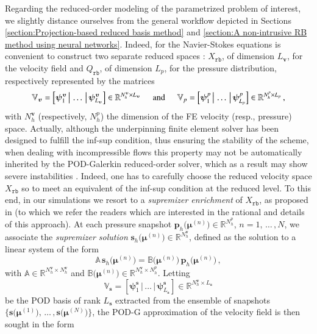 \documentclass{elsarticle}
\numberwithin{equation}{section}
\theoremstyle{theorem}
\theoremstyle{definition}
\theoremstyle{remark}
\theoremstyle{proposition}
\numberwithin{figure}{section}
\newcommand{\bg}[1]{\boldsymbol{#1}}
\begin{document}
		Regarding the reduced-order modeling of the parametrized problem of interest, we slightly distance ourselves from the general workflow depicted in Sections \ref{section:Projection-based reduced basis method} and \ref{section:A non-intrusive RB method using neural networks}. Indeed, for the Navier-Stokes equations is convenient to construct two separate reduced spaces \cite{Bal14, Chen17, QMN15}: $X_{\texttt{rb}}$, of dimension $L_{\bg{v}}$, for the velocity field and $Q_{\texttt{rb}}$, of dimension $L_p$, for the pressure distribution, respectively represented by the matrices 
		\begin{equation*}
			\mathbb{V}_{\bg{v}} = \left[ \bg{\psi}_1^{\bg{v}} \, \big| \, \ldots \, \big| \, \bg{\psi}_{L_{\bg{v}}}^{\bg{v}} \right] \in \mathbb{R}^{N_h^{\bg{v}} \times L_{\bg{v}}} \hspace*{0.5cm} \text{and} \hspace*{0.5cm} \mathbb{V}_p = \left[ \bg{\psi}_1^p \, \big| \, \ldots \, \big| \, \bg{\psi}_{L_p}^p \right] \in \mathbb{R}^{N_h^p \times L_p} \, ,
		\end{equation*} 
		with $N_h^{\bg{v}}$ (respectively, $N_h^p$) the dimension of the FE velocity (resp., pressure) space. Actually, although the underpinning finite element solver has been designed to fulfill the inf-sup condition, thus ensuring the stability of the scheme, when dealing with incompressible flows this property may not be automatically inherited by the POD-Galerkin reduced-order solver, which as a result may show severe instabilities \cite{Bur06}. Indeed, one has to carefully choose the reduced velocity space $X_{\texttt{rb}}$ so to meet an equivalent of the inf-sup condition at the reduced level. To this end, in our simulations we resort to a \emph{supremizer enrichment} of $X_{\texttt{rb}}$, as proposed in \cite{Bal14} (to which we refer the readers which are interested in the rational and details of this approach). At each pressure snapshot $\mathbf{p}_h \big( \bg{\mu}^{(n)} \big) \in \mathbb{R}^{N_h^p}$, $n = 1, \, \ldots \, , N$, we associate the \emph{supremizer solution} $\mathbf{s}_h \big( \bg{\mu}^{(n)} \big) \in \mathbb{R}^{N_h^{\bg{v}}}$, defined as the solution to a linear system of the form
		\begin{equation*}
			\mathbb{A} \, \mathbf{s}_h \big( \bg{\mu}^{(n)} \big) = \mathbb{B} \big( \bg{\mu}^{(n)} \big) \, \mathbf{p}_h \big( \bg{\mu}^{(n)} \big) \, ,
		\end{equation*}
		with $\mathbb{A} \in \mathbb{R}^{N_h^{\bg{v}} \times N_h^{\bg{v}}}$ and $\mathbb{B} \big( \bg{\mu}^{(n)} \big) \in \mathbb{R}^{N_h^{\bg{v}} \times N_h^p}$. Letting \[ \mathbb{V}_{\bg{s}} = \left[ \bg{\psi}_1^{\bg{s}} \, \big| \, \ldots \, \big| \, \bg{\psi}_{L_{\bg{s}}}^{\bg{s}} \right] \in \mathbb{R}^{N_h^{\bg{v}} \times L_{\bg{s}}} \] be the POD basis of rank $L_{\bg{s}}$ extracted from the ensemble of snapshots $\big\lbrace \mathbf{s} \big( \bg{\mu}^{(1)} \big) , \, \ldots \, , \mathbf{s} \big( \bg{\mu}^{(N)} \big) \big\rbrace$, the POD-G approximation of the velocity field is then sought in the form
\end{document}
